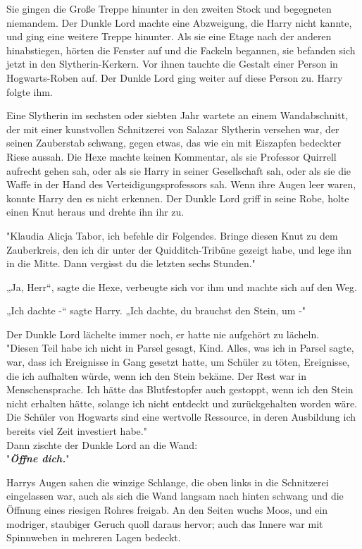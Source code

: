 {Sie gingen die Große Treppe hinunter in den zweiten Stock und begegneten niemandem. Der Dunkle Lord machte eine Abzweigung, die Harry nicht kannte, und ging eine weitere Treppe hinunter. Als sie eine Etage nach der anderen hinabstiegen, hörten die Fenster auf und die Fackeln begannen, sie befanden sich jetzt in den Slytherin-Kerkern. Vor ihnen tauchte die Gestalt einer Person in Hogwarts-Roben auf. Der Dunkle Lord ging weiter auf diese Person zu. Harry folgte ihm.

Eine Slytherin im sechsten oder siebten Jahr wartete an einem Wandabschnitt, der mit einer kunstvollen Schnitzerei von Salazar Slytherin versehen war, der seinen Zauberstab schwang, gegen etwas, das wie ein mit Eiszapfen bedeckter Riese aussah. Die Hexe machte keinen Kommentar, als sie Professor Quirrell aufrecht gehen sah, oder als sie Harry in seiner Gesellschaft sah, oder als sie die Waffe in der Hand des Verteidigungsprofessors sah. Wenn ihre Augen leer waren, konnte Harry den es nicht erkennen. Der Dunkle Lord griff in seine Robe, holte einen Knut heraus und drehte ihn ihr zu.

"Klaudia Alicja Tabor, ich befehle dir Folgendes. Bringe diesen Knut zu dem Zauberkreis, den ich dir unter der Quidditch-Tribüne gezeigt habe, und lege ihn in die Mitte. Dann vergisst du die letzten sechs Stunden."

„Ja, Herr“, sagte die Hexe, verbeugte sich vor ihm und machte sich auf den Weg.

„Ich dachte -“ sagte Harry. „Ich dachte, du brauchst den Stein, um -"

Der Dunkle Lord lächelte immer noch, er hatte nie aufgehört zu lächeln.\\ "Diesen Teil habe ich nicht in Parsel gesagt, Kind. Alles, was ich in Parsel sagte, war, dass ich Ereignisse in Gang gesetzt hatte, um Schüler zu töten, Ereignisse, die ich aufhalten würde, wenn ich den Stein bekäme. Der Rest war in Menschensprache. Ich hätte das Blutfestopfer auch gestoppt, wenn ich den Stein nicht erhalten hätte, solange ich nicht entdeckt und zurückgehalten worden wäre. Die Schüler von Hogwarts sind eine wertvolle Ressource, in deren Ausbildung ich bereits viel Zeit investiert habe."\\ Dann zischte der Dunkle Lord an die Wand:\\ "\textbf{\emph{Öffne dich.}}"

Harrys Augen sahen die winzige Schlange, die oben links in die Schnitzerei eingelassen war, auch als sich die Wand langsam nach hinten schwang und die Öffnung eines riesigen Rohres freigab. An den Seiten wuchs Moos, und ein modriger, staubiger Geruch quoll daraus hervor; auch das Innere war mit Spinnweben in mehreren Lagen bedeckt.

}
